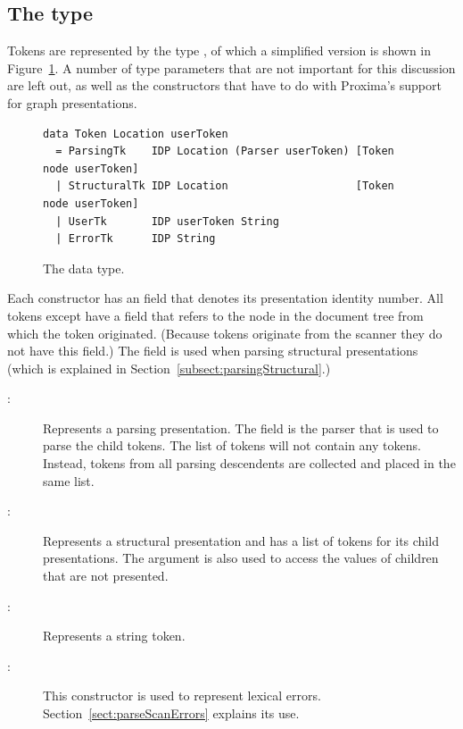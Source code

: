 \documentclass[12pt]{article}
\begin{document}
\subsection{The  type}

Tokens are represented by the type , of which a simplified version is shown in Figure~\ref{fig:tokenType}. A number of type parameters that are not important for this discussion are left out, as well as the constructors that have to do with Proxima's support for graph presentations.

\begin{figure}
\begin{center}
\begin{footnotesize}
\begin{verbatim}
data Token Location userToken 
  = ParsingTk    IDP Location (Parser userToken) [Token node userToken]
  | StructuralTk IDP Location                    [Token node userToken]
  | UserTk       IDP userToken String 
  | ErrorTk      IDP String 
\end{verbatim}
\end{footnotesize}
\caption{The  data type.} \label{fig:tokenType} 
\end{center}
\end{figure}


Each constructor has an  field that denotes its presentation identity number. All tokens except  have a  field that refers to the node in the document tree from which the token originated. (Because  tokens originate from the scanner they do not have this field.) The  field is used when parsing structural presentations (which is explained in Section~\ref{subsect:parsingStructural}.) 

\begin{description}
\item[:] Represents a parsing presentation. The field  is the parser that is used to parse the child tokens. The list of tokens will not contain any  tokens. Instead, tokens from all parsing descendents are collected and placed in the same list.
\item[:] Represents a structural presentation and has a list of tokens for its child presentations. The  argument is also used to access the values of children that are not presented. 
\item[:] Represents a string token. %
\item[:] This constructor is used to represent lexical errors. Section~\ref{sect:parseScanErrors} explains its use.
\end{description}
\end{document}
